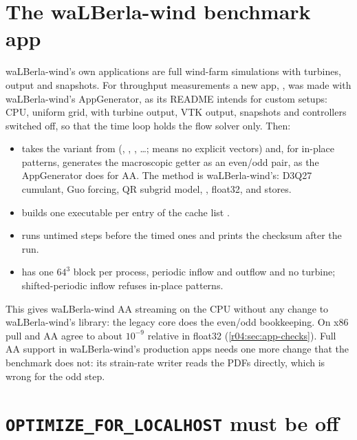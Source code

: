 \section{The waLBerla-wind benchmark app}\label{r04:sec:wind-app}

waLBerla-wind's own applications are full wind-farm simulations with turbines, output
and snapshots. For throughput measurements a new app,
, was made with waLBerla-wind's AppGenerator, as
its README intends for custom setups: CPU, uniform grid, with turbine output, VTK
output, snapshots and controllers switched off, so that the time loop holds the flow
solver only. Then:
\begin{itemize}
  \item {} takes the variant  from
     (, ,
    , \dots;  means no explicit vectors) and,
    for in-place patterns, generates the macroscopic getter as an even/odd pair, as the
    AppGenerator does for AA. The method is waLBerla-wind's: D3Q27 cumulant, Guo
    forcing, QR subgrid model, , float32, and  stores.
  \item {} builds one executable per entry of the cache list
    .
  \item {} runs  untimed steps before the
    timed ones and prints the checksum after the run.
  \item {} has one $64^3$ block per process, periodic inflow and
    outflow and no turbine; shifted-periodic inflow refuses in-place patterns.
\end{itemize}
This gives waLBerla-wind AA streaming on the CPU without any change to waLBerla-wind's
library: the legacy core does the even/odd bookkeeping. On x86 pull and AA agree to
about $10^{-9}$ relative in float32 (\cref{r04:sec:app-checks}). Full AA support in
waLBerla-wind's production apps needs one more change that the benchmark does not:
its strain-rate writer reads the PDFs directly, which is wrong for the odd step.

\section{\texttt{OPTIMIZE\_FOR\_LOCALHOST} must be off}\label{r04:sec:localhost}

